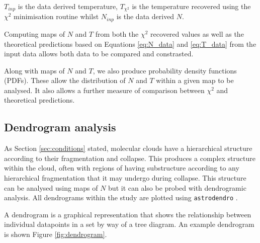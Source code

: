 \documentclass{report}
\begin{document}
$T_{inp}$ is the data derived temperature, $T_{\chi^{2}}$ is the temperature recovered using the $\chi^{2}$ minimisation routine whilst $N_{inp}$ is the data derived $N$.

Computing maps of $N$ and $T$ from both the $\chi^{2}$ recovered values as well as the theoretical predictions based on Equations \ref{eq:N_data} and \ref{eq:T_data} from the input data allows both data to be compared and constrasted.

Along with maps of $N$ and $T$, we also produce probability density functions (PDFs). These allow the distribution of $N$ and $T$ within a given map to be analysed. It also allows a further measure of comparison between $\chi^{2}$ and theoretical predictions.

\subsection{Dendrogram analysis}
As Section \ref{sec:conditions} stated, molecular clouds have a hierarchical structure according to their fragmentation and collapse. This produces a complex structure within the cloud, often with regions of having substructure according to any hierarchical fragmentation that it may undergo during collapse. This structure can be analysed using maps of $N$ but it can also be probed with dendrogramic analysis. All dendrograms within the study are plotted using \texttt{astrodendro} \parencite{astrodendro}.

A dendrogram is a graphical representation that shows the relationship between individual datapoints in a set by way of a tree diagram. An example dendrogram is shown Figure \ref{fig:dendrogram}.
\end{document}

